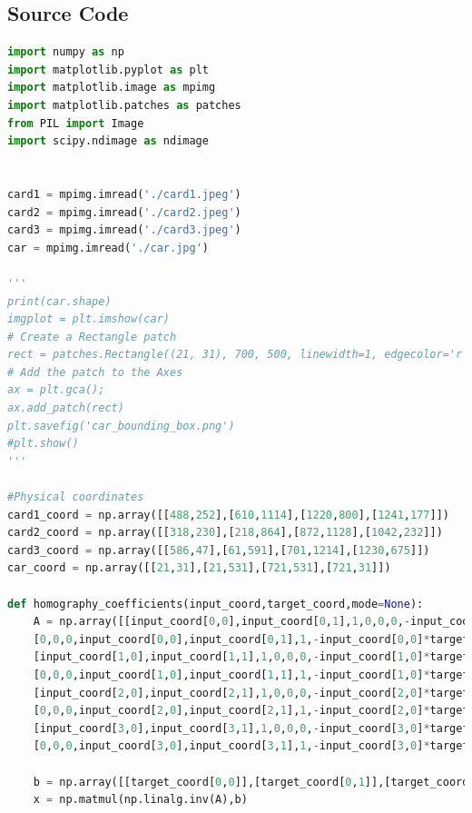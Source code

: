 \documentclass{article}
\begin{document}
\subsection{Source Code}
\begin{lstlisting}[language=Python]
import numpy as np
import matplotlib.pyplot as plt
import matplotlib.image as mpimg
import matplotlib.patches as patches
from PIL import Image
import scipy.ndimage as ndimage


card1 = mpimg.imread('./card1.jpeg')
card2 = mpimg.imread('./card2.jpeg')
card3 = mpimg.imread('./card3.jpeg')
car = mpimg.imread('./car.jpg')

'''
print(car.shape)
imgplot = plt.imshow(car)
# Create a Rectangle patch
rect = patches.Rectangle((21, 31), 700, 500, linewidth=1, edgecolor='r', facecolor='none')
# Add the patch to the Axes
ax = plt.gca();
ax.add_patch(rect)
plt.savefig('car_bounding_box.png')
#plt.show()
'''

#Physical coordinates
card1_coord = np.array([[488,252],[610,1114],[1220,800],[1241,177]])
card2_coord = np.array([[318,230],[218,864],[872,1128],[1042,232]])
card3_coord = np.array([[586,47],[61,591],[701,1214],[1230,675]])
car_coord = np.array([[21,31],[21,531],[721,531],[721,31]])

def homography_coefficients(input_coord,target_coord,mode=None):
	A = np.array([[input_coord[0,0],input_coord[0,1],1,0,0,0,-input_coord[0,0]*target_coord[0,0],-input_coord[0,1]*target_coord[0,0]],\
	[0,0,0,input_coord[0,0],input_coord[0,1],1,-input_coord[0,0]*target_coord[0,1],-input_coord[0,1]*target_coord[0,1]],\
	[input_coord[1,0],input_coord[1,1],1,0,0,0,-input_coord[1,0]*target_coord[1,0],-input_coord[1,1]*target_coord[1,0]],\
	[0,0,0,input_coord[1,0],input_coord[1,1],1,-input_coord[1,0]*target_coord[1,1],-input_coord[1,1]*target_coord[1,1]],\
	[input_coord[2,0],input_coord[2,1],1,0,0,0,-input_coord[2,0]*target_coord[2,0],-input_coord[2,1]*target_coord[2,0]],\
	[0,0,0,input_coord[2,0],input_coord[2,1],1,-input_coord[2,0]*target_coord[2,1],-input_coord[2,1]*target_coord[2,1]],\
	[input_coord[3,0],input_coord[3,1],1,0,0,0,-input_coord[3,0]*target_coord[3,0],-input_coord[3,1]*target_coord[3,0]],\
	[0,0,0,input_coord[3,0],input_coord[3,1],1,-input_coord[3,0]*target_coord[3,1],-input_coord[3,1]*target_coord[3,1]]])

	b = np.array([[target_coord[0,0]],[target_coord[0,1]],[target_coord[1,0]],[target_coord[1,1]],[target_coord[2,0]],[target_coord[2,1]],[target_coord[3,0]],[target_coord[3,1]]])
	x = np.matmul(np.linalg.inv(A),b)


\end{lstlisting}
\end{document}
